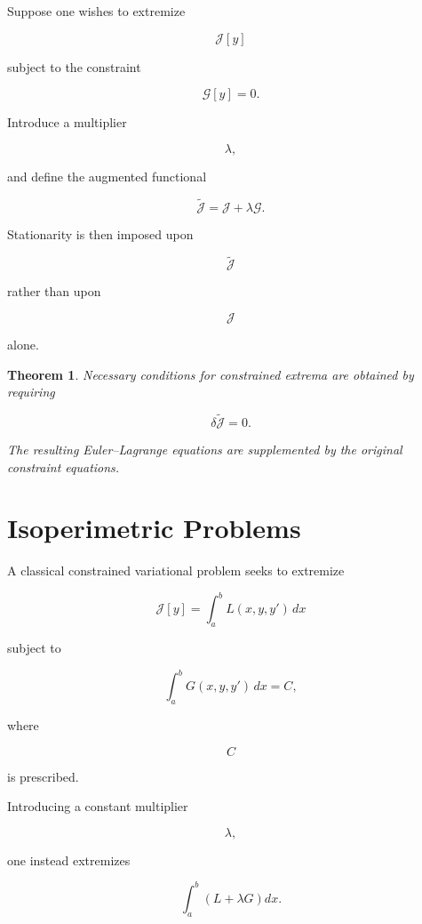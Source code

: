 \documentclass[11pt,fleqn]{book}
\numberwithin{equation}{chapter}
\theoremstyle{plain}
\newtheorem{theorem}{Theorem}[chapter]
\theoremstyle{definition}
\theoremstyle{remark}
\begin{document}
Suppose one wishes to extremize

\[
\mathcal J[y]
\]

subject to the constraint

\[
\mathcal G[y]=0.
\]

Introduce a multiplier

\[
\lambda,
\]

and define the augmented functional

\[
\boxed{
\widetilde{\mathcal J}
=
\mathcal J
+
\lambda
\mathcal G.
}
\]

Stationarity is then imposed upon

\[
\widetilde{\mathcal J}
\]

rather than upon

\[
\mathcal J
\]

alone.


\begin{theorem}

Necessary conditions for constrained extrema are obtained by requiring

\[
\delta\widetilde{\mathcal J}
=
0.
\]

The resulting Euler--Lagrange equations are supplemented by the original
constraint equations.

\end{theorem}


\section{Isoperimetric Problems}

A classical constrained variational problem seeks to extremize

\[
\mathcal J[y]
=
\int_a^b
L(x,y,y')
\,dx
\]

subject to

\[
\boxed{
\int_a^b
G(x,y,y')
\,dx
=
C,
}
\]

where

\[
C
\]

is prescribed.

Introducing a constant multiplier

\[
\lambda,
\]

one instead extremizes

\[
\boxed{
\int_a^b
\left(
L
+
\lambda G
\right)
dx.
}
\]
\end{document}

